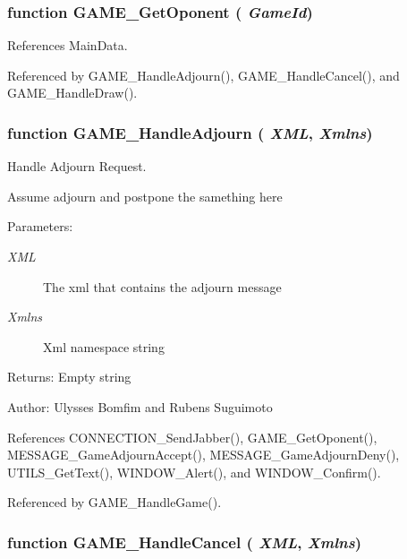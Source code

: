 \subsubsection[GAME\_\-GetOponent]{\setlength{\rightskip}{0pt plus 5cm}function GAME\_\-GetOponent ( {\em GameId})}\label{game_2game_8js_cd8b0b4bccaf511c360f83a3bb9ea837}




References MainData.

Referenced by GAME\_\-HandleAdjourn(), GAME\_\-HandleCancel(), and GAME\_\-HandleDraw().
\subsubsection[GAME\_\-HandleAdjourn]{\setlength{\rightskip}{0pt plus 5cm}function GAME\_\-HandleAdjourn ( {\em XML}, \/   {\em Xmlns})}\label{game_2game_8js_90b065f83011d192e512558c12d68c00}


Handle Adjourn Request. 

Assume adjourn and postpone the samething here

\begin{Desc}
\item[Parameters:]
\begin{description}
\item[{\em XML}]The xml that contains the adjourn message \item[{\em Xmlns}]Xml namespace string \end{description}
\end{Desc}
\begin{Desc}
\item[Returns:]Empty string \end{Desc}
\begin{Desc}
\item[Author:]Ulysses Bomfim and Rubens Suguimoto \end{Desc}


References CONNECTION\_\-SendJabber(), GAME\_\-GetOponent(), MESSAGE\_\-GameAdjournAccept(), MESSAGE\_\-GameAdjournDeny(), UTILS\_\-GetText(), WINDOW\_\-Alert(), and WINDOW\_\-Confirm().

Referenced by GAME\_\-HandleGame().
\subsubsection[GAME\_\-HandleCancel]{\setlength{\rightskip}{0pt plus 5cm}function GAME\_\-HandleCancel ( {\em XML}, \/   {\em Xmlns})}\label{game_2game_8js_b5fd476347e869125f280d74d4934c00}


